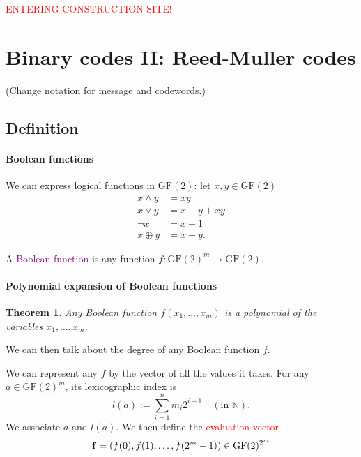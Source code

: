 \documentclass[a4paper, 11pt, openany]{book}
\numberwithin{equation}{section}
\theoremstyle{plain}
\newtheorem{theorem}	[equation]	{Theorem}
\theoremstyle{definition}
\newcommand{\GF}{\mathrm{GF}}
\newcommand{\Important}[1]{\textcolor{red}{#1}}
\newcommand{\Define}[1]{\textcolor{purple}{#1}}
\begin{document}
\begin{center}
\Huge{\textcolor{red}{ ENTERING CONSTRUCTION SITE! }}
\end{center}


\section{Binary codes II: Reed-Muller codes}
\label{sec:25}


(Change notation for message and codewords.)


\subsection{Definition}

\paragraph{Boolean functions}
We can express logical functions in $\GF(2)$: let $x,y \in \GF(2)$
\begin{align*}
	x \land y &= xy\\
	x \lor y &= x + y + xy\\
	\neg x &= x + 1\\
	x \oplus y &= x + y.
\end{align*}

A \Define{Boolean function} is any function $f : \GF(2)^m \to \GF(2)$.


\paragraph{Polynomial expansion of Boolean functions}
\begin{theorem} 
Any Boolean function $f(x_1, \dots, x_m)$ is a polynomial of the variables $x_1, \dots, x_m$.
\end{theorem}

%
We can then talk about the degree of any Boolean function $f$.

We can represent any $f$ by the vector of all the values it takes. For any $a \in \GF(2)^m$, its lexicographic index is
\[
	l(a) := \sum_{i=1}^n m_i 2^{i-1} \quad (\text{in } \mathbb{N}). 
\]
We associate $a$ and $l(a)$. We then define the \Important{evaluation vector} 
\[
    {\bf f} = (f(0), f(1), \dots, f(2^m-1)) \in \GF(2)^{2^m}
\]
\end{document}
